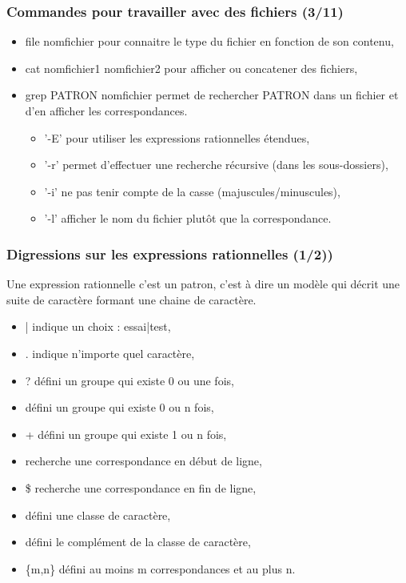 \documentclass[handout,10pt]{beamer}
\begin{document}
\frame
{
    \frametitle{Commandes pour travailler avec des fichiers (3/11)}

     \begin{itemize}
        \item {\ttfamily file nomfichier} pour connaitre le type du fichier en fonction de son contenu,
        \item {\ttfamily cat nomfichier1 nomfichier2} pour afficher ou concatener des fichiers,
        \item {\ttfamily grep PATRON nomfichier} permet de rechercher PATRON dans un fichier et d'en afficher les correspondances.
            \begin{itemize}
                \item '-E' pour utiliser les expressions rationnelles étendues,
                \item '-r' permet d'effectuer une recherche récursive (dans les sous-dossiers),
                \item '-i' ne pas tenir compte de la casse (majuscules/minuscules),
                \item '-l' afficher le nom du fichier plutôt que la correspondance.
            \end{itemize}
    \end{itemize}
}


\frame
{
    \frametitle{Digressions sur les expressions rationnelles (1/2))}

    Une expression rationnelle c'est un patron, c'est à dire un modèle qui décrit une suite de caractère formant une chaine de caractère.

    \begin{itemize}
        \item {\ttfamily |} indique un choix : essai|test,
        \item {\ttfamily .} indique n'importe quel caractère,
        \item {\ttfamily ?} défini un groupe qui existe 0 ou une fois,
        \item {\ttfamily *} défini un groupe qui existe 0 ou n fois,
        \item {\ttfamily +} défini un groupe qui existe 1 ou n fois,
        \item {\ttfamily \circonflexe} recherche une correspondance en début de ligne,
        \item {\ttfamily \$} recherche une correspondance en fin de ligne,
        \item {\ttfamily [~]} défini une classe de caractère,
        \item {\ttfamily [\circonflexe ~]} défini le complément de la classe de caractère,
        \item {\ttfamily \{m,n\}} défini au moins m correspondances et au plus n.
    \end{itemize}
}
\end{document}
